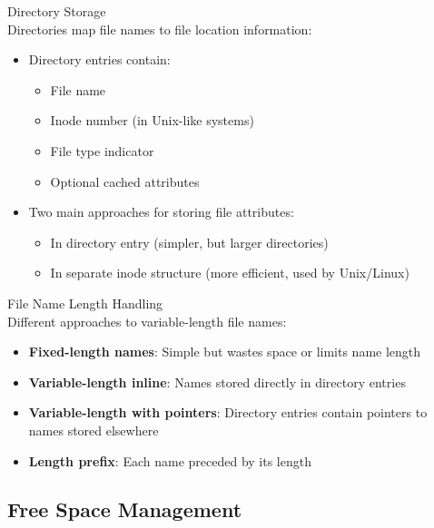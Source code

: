 \begin{definition}{Directory Storage}\\
    Directories map file names to file location information:
    \begin{itemize}
        \item Directory entries contain:
            \begin{itemize}
                \item File name
                \item Inode number (in Unix-like systems)
                \item File type indicator
                \item Optional cached attributes
            \end{itemize}
        \item Two main approaches for storing file attributes:
            \begin{itemize}
                \item In directory entry (simpler, but larger directories)
                \item In separate inode structure (more efficient, used by Unix/Linux)
            \end{itemize}
    \end{itemize}
\end{definition}

\begin{definition}{File Name Length Handling}\\
    Different approaches to variable-length file names:
    \begin{itemize}
        \item \textbf{Fixed-length names}: Simple but wastes space or limits name length
        \item \textbf{Variable-length inline}: Names stored directly in directory entries
        \item \textbf{Variable-length with pointers}: Directory entries contain pointers to names stored elsewhere
        \item \textbf{Length prefix}: Each name preceded by its length
    \end{itemize}
\end{definition}

\subsection{Free Space Management}

